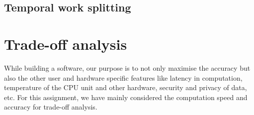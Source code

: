 \documentclass{article}
\begin{document}
\subsection{Temporal work splitting}

\section{Trade-off analysis}
While building a software, our purpose is to not only maximise the accuracy but also the other user and hardware specific features like latency in computation, temperature of the CPU unit and other hardware, security and privacy of data, etc. For this assignment, we have mainly considered the computation speed and accuracy for trade-off analysis.


\end{document}
